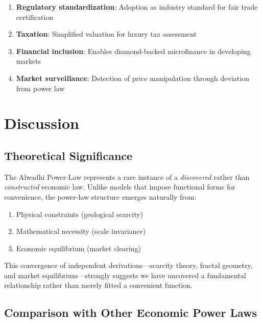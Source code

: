 \documentclass[12pt,a4paper]{article}
\theoremstyle{definition}
\theoremstyle{remark}
\begin{document}
\begin{enumerate}
\item \textbf{Regulatory standardization}: Adoption as industry standard for fair trade certification
\item \textbf{Taxation}: Simplified valuation for luxury tax assessment
\item \textbf{Financial inclusion}: Enables diamond-backed microfinance in developing markets
\item \textbf{Market surveillance}: Detection of price manipulation through deviation from power law
\end{enumerate}

\section{Discussion}

\subsection{Theoretical Significance}

The Alwadhi Power-Law represents a rare instance of a \textit{discovered} rather than \textit{constructed} economic law. Unlike models that impose functional forms for convenience, the power-law structure emerges naturally from:

\begin{enumerate}
\item Physical constraints (geological scarcity)
\item Mathematical necessity (scale invariance)
\item Economic equilibrium (market clearing)
\end{enumerate}

This convergence of independent derivations—scarcity theory, fractal geometry, and market equilibrium—strongly suggests we have uncovered a fundamental relationship rather than merely fitted a convenient function.

\subsection{Comparison with Other Economic Power Laws}
\end{document}
